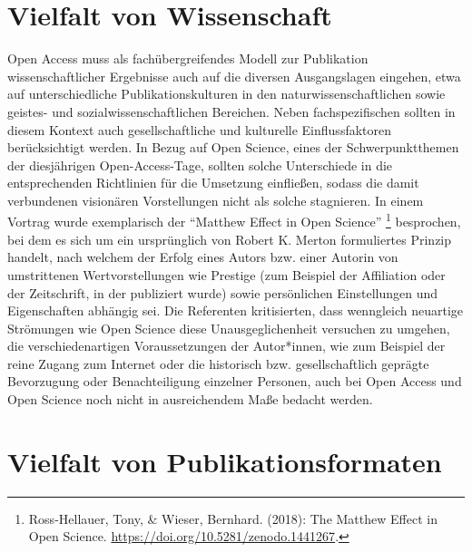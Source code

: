 \documentclass[a4paper,
fontsize=11pt,
oneside,
numbers=noperiodatend,
parskip=half-,
bibliography=totoc,
final
]{scrartcl}
\begin{document}
\hypertarget{vielfalt-von-wissenschaft}{%
\section{Vielfalt von
Wissenschaft}\label{vielfalt-von-wissenschaft}}

Open Access muss als fachübergreifendes Modell zur Publikation
wissenschaftlicher Ergebnisse auch auf die diversen Ausgangslagen
eingehen, etwa auf unterschiedliche Publikationskulturen in den
naturwissenschaftlichen sowie geistes- und sozialwissenschaftlichen
Bereichen. Neben fachspezifischen sollten in diesem Kontext auch
gesellschaftliche und kulturelle Einflussfaktoren berücksichtigt werden.
In Bezug auf Open Science, eines der Schwerpunktthemen der diesjährigen
Open-Access-Tage, sollten solche Unterschiede in die entsprechenden
Richtlinien für die Umsetzung einfließen, sodass die damit verbundenen
visionären Vorstellungen nicht als solche stagnieren. In einem Vortrag
wurde exemplarisch der \enquote{Matthew Effect in Open Science}
\footnote{Ross-Hellauer, Tony, \& Wieser, Bernhard. (2018): The Matthew
  Effect in Open Science. \url{https://doi.org/10.5281/zenodo.1441267}.}
besprochen, bei dem es sich um ein ursprünglich von Robert K. Merton
formuliertes Prinzip handelt, nach welchem der Erfolg eines Autors bzw.
einer Autorin von umstrittenen Wertvorstellungen wie Prestige (zum
Beispiel der Affiliation oder der Zeitschrift, in der publiziert wurde)
sowie persönlichen Einstellungen und Eigenschaften abhängig sei. Die
Referenten kritisierten, dass wenngleich neuartige Strömungen wie Open
Science diese Unausgeglichenheit versuchen zu umgehen, die
verschiedenartigen Voraussetzungen der Autor*innen, wie zum Beispiel der
reine Zugang zum Internet oder die historisch bzw. gesellschaftlich
geprägte Bevorzugung oder Benachteiligung einzelner Personen, auch bei
Open Access und Open Science noch nicht in ausreichendem Maße bedacht
werden.

\hypertarget{vielfalt-von-publikationsformaten}{%
\section{Vielfalt von
Publikationsformaten}\label{vielfalt-von-publikationsformaten}}
\end{document}
